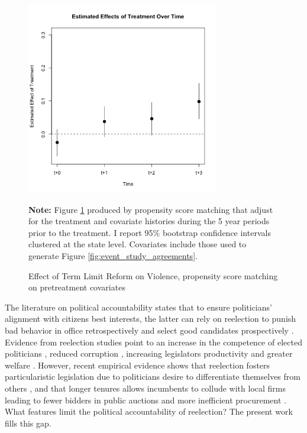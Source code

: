 \documentclass[12pt]{amsart}
\makeatletter
\def\section{\@startsection{section}{1}
	\z@{1.0\linespacing\@plus\linespacing}{.5\linespacing}{\Large}}
\numberwithin{equation}{section}
\theoremstyle{definition}
\theoremstyle{definition}
\theoremstyle{definition}
\makeatother
\begin{document}
\begin{figure}[H] 
\centering
 \caption{Effect of Term Limit Reform on Violence, propensity score matching on pretreatment covariates}
 \label{fig:matching_violence}
\includegraphics[width=0.75\textwidth]{../Figures/panelmatch_logdefuncionespc.png}
       \captionsetup{justification=centering}
    
        
 \textbf{Note:} Figure \ref{fig:matching_violence} produced by propensity score matching that adjust for the treatment and covariate histories during the 5 year periods prior to the treatment. I report 95\% bootstrap confidence intervals clustered at the state level. Covariates include those used to generate Figure \ref{fig:event_study_agreements}. 
 
\end{figure}   
           
    

\section{Introduction}

     

The literature on political accountability states that to ensure politicians' alignment with citizens best interests, the latter can rely on reelection to punish bad behavior in office retrospectively and select good candidates prospectively \citep{manin_etal_1999}. Evidence from reelection studies point to an increase in the competence of elected politicians \citep{dalbo_etal_2017}, reduced corruption \citep{ferraz_finan_2011}, increasing legislators productivity \citep{hall_etal_2018} and greater welfare \citep{alt_etal_2011}. However, recent empirical evidence shows that reelection fosters particularistic legislation due to politicians desire to differentiate themselves from others \citep{motolinia_2020}, and that longer tenures allows incumbents to collude with local firms leading to fewer bidders in public auctions and more inefficient procurement \citep{coviello_etal_2017}. %
What features limit the political accountability of reelection? The present work fills this gap.       
\end{document}
